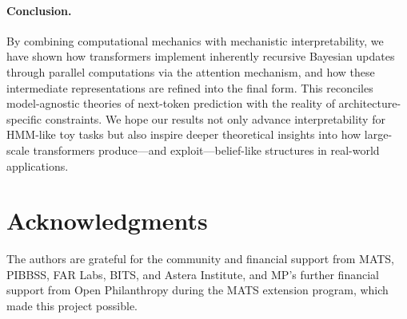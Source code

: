 \documentclass{article}
\theoremstyle{plain}
\theoremstyle{definition}
\theoremstyle{remark}
\begin{document}
\paragraph{Conclusion.}
By combining computational mechanics with mechanistic interpretability, we have shown how transformers implement inherently recursive Bayesian updates through parallel computations via the attention mechanism, and how these intermediate representations are refined into the final form.
This reconciles model-agnostic theories of next-token prediction with the reality of architecture-specific constraints.
We hope our results not only advance interpretability for HMM-like toy tasks but also inspire deeper theoretical insights into how large-scale transformers produce—and exploit—belief-like structures in real-world applications.








\section*{Acknowledgments}

The authors are grateful for the community and financial support from MATS, PIBBSS, FAR Labs, BITS, and Astera Institute, 
and MP's further financial support from Open Philanthropy during the MATS extension program, which made this project possible.  
\end{document}
